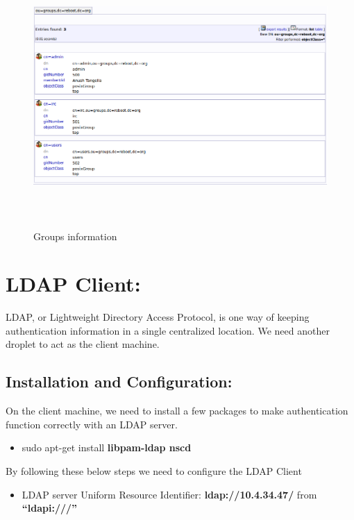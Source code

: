 \documentclass[12pt]{report}
\begin{document}
		\begin{figure}[H]
		\begin{center}
		\includegraphics[width=17cm,height=10cm]{Screens/Groupsinfo.png}
		\caption{Groups information \label{fig:Groups information}}
		\end{center}
		\end{figure}
		
\section{LDAP Client:}		
	LDAP, or Lightweight Directory Access Protocol, is one way of keeping authentication information in a single centralized location. We need another droplet to act as the client machine.
	\subsection{Installation and Configuration:}
		On the client machine, we need to install a few packages to make authentication function correctly with an LDAP server.	
		\begin{itemize}
		\item sudo apt-get install \textbf{libpam-ldap nscd}
		\end{itemize}		 
By following these below steps we need to configure the LDAP Client
		\begin{itemize}
		\item LDAP server Uniform Resource Identifier: \textbf{ldap://10.4.34.47/} from \textbf{``ldapi:///''}		
		\end{itemize}
\end{document}
